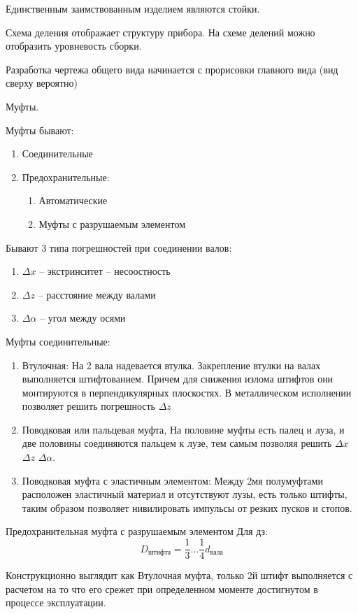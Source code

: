 \documentclass{article}
\begin{document}
Единственным заимствованным изделием являются стойки.

Схема деления отображает структуру прибора. На схеме делений можно отобразить уровневость сборки.

Разработка чертежа общего вида начинается с прорисовки главного вида (вид сверху вероятно)

Муфты.

Муфты бывают:
\begin{enumerate}
	\item Соединительные
	\item Предохранительные:
	\begin{enumerate}
		\item Автоматические
		\item Муфты с разрушаемым элементом
	\end{enumerate}
\end{enumerate}

Бывают 3 типа погрешностей при соединении валов:
\begin{enumerate}
	\item $ \Delta x$ -- экстринситет -- несоостность
	\item $ \Delta z$ -- расстояние между валами
	\item $ \Delta \alpha$ -- угол между осями
\end{enumerate}

Муфты соединительные:
\begin{enumerate}
	\item Втулочная: На 2 вала надевается втулка. Закрепление втулки на валах выполняется штифтованием. Причем для снижения излома штифтов они монтируются в перпендикулярных плоскостях. В металлическом исполнении позволяет решить погрешность $ \Delta z$
	\item Поводковая или пальцевая муфта, На половине муфты есть палец и луза, и две половины соединяются пальцем к лузе, тем самым позволяя решить $ \Delta x$ $ \Delta z$ $ \Delta \alpha$.
	\item Поводковая муфта с эластичным элементом: Между 2мя полумуфтами расположен эластичный материал и отсутствуют лузы, есть только штифты, таким образом позволяет нивилировать импульсы от резких пусков и стопов.
\end{enumerate}

Предохранительная муфта с разрушаемым элементом
Для дз:
$$
D_{штифта} = \frac{1}{3} ... \frac{1}{4} d_{вала}
$$

Конструкционно выглядит как Втулочная муфта, только 2й штифт выполняется с расчетом на то что его срежет при определенном моменте достигнутом в процессе эксплуатации.
\end{document}
